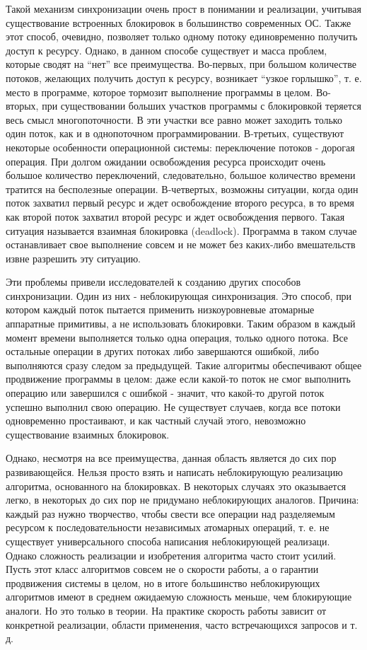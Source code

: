 \documentclass[12pt]{article}
\begin{document}
{			\par Такой механизм синхронизации очень прост в понимании и реализации, учитывая существование встроенных блокировок в большинство современных ОС. Также этот способ, очевидно, позволяет только одному потоку единовременно получить доступ к ресурсу. Однако, в данном способе существует и масса проблем, которые сводят на “нет” все преимущества. Во-первых, при большом количестве потоков, желающих получить доступ к ресурсу, возникает “узкое горлышко”, т. е. место в программе, которое тормозит выполнение программы в целом. Во-вторых, при существовании больших участков программы с блокировкой теряется весь смысл многопоточности. В эти участки все равно может заходить только один поток, как и в однопоточном программировании. В-третьих, существуют некоторые особенности операционной системы: переключение потоков - дорогая операция. При долгом ожидании освобождения ресурса происходит очень большое количество переключений, следовательно, большое количество времени тратится на бесполезные операции. В-четвертых, возможны ситуации, когда один поток захватил первый ресурс и ждет освобождение второго ресурса, в то время как второй поток захватил второй ресурс и ждет освобождения первого. Такая ситуация называется взаимная блокировка (deadlock). Программа в таком случае останавливает свое выполнение совсем и не может без каких-либо вмешательств извне разрешить эту ситуацию.
			\par Эти проблемы привели исследователей к созданию других способов синхронизации. Один из них - неблокирующая синхронизация. Это способ, при котором каждый поток пытается применить низкоуровневые атомарные аппаратные примитивы, а не использовать блокировки. Таким образом в каждый момент времени выполняется только одна операция, только одного потока. Все остальные операции в других потоках либо завершаются ошибкой, либо выполняются сразу следом за предыдущей. Такие алгоритмы обеспечивают общее продвижение программы в целом: даже если какой-то поток не смог выполнить операцию или завершился с ошибкой - значит, что какой-то другой поток успешно выполнил свою операцию. Не существует случаев, когда все потоки одновременно простаивают, и как частный случай этого, невозможно существование взаимных блокировок. 
			\par Однако, несмотря на все преимущества, данная область является до сих пор развивающейся. Нельзя просто взять и написать неблокирующую реализацию алгоритма, основанного на блокировках. В некоторых случаях это оказывается легко, в некоторых до сих пор не придумано неблокирующих аналогов. Причина: каждый раз нужно творчество, чтобы свести все операции над разделяемым ресурсом к последовательности независимых атомарных операций, т. е. не существует универсального способа написания неблокирующей реализаци. Однако сложность реализации и изобретения алгоритма часто стоит усилий. Пусть этот класс алгоритмов совсем не о скорости работы, а о гарантии продвижения системы в целом, но в итоге большинство неблокирующих алгоритмов имеют в среднем ожидаемую сложность меньше, чем блокирующие аналоги. Но это только в теории. На практике скорость работы зависит от конкретной реализации, области применения, часто встречающихся запросов и т. д.
}
\end{document}
